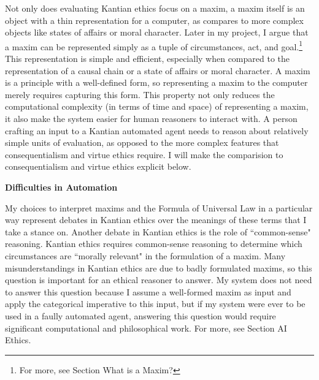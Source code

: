 \begin{isabellebody}
\begin{isamarkuptext}
Not only does evaluating Kantian ethics focus on a maxim, a maxim itself is an object
with a thin representation for a computer, as compares to more complex objects like states of 
affairs or moral character. Later in my project, I argue that a maxim can be represented simply as 
a tuple of circumstances, act, and goal.\footnote{For more, see Section What is a Maxim?} This representation
is simple and efficient, especially when compared to the representation of a causal chain or a state of 
affairs or moral character. A maxim is a principle with a well-defined form, so representing a maxim
to the computer merely requires capturing this form. This property not only reduces the computational complexity
(in terms of time and space) of representing a maxim, it also make the system easier for human reasoners
to interact with. A person crafting an input to a Kantian automated agent needs to reason about relatively
simple units of evaluation, as opposed to the more complex features that consequentialism and virtue
ethics require. I will make the comparision to consequentialism and virtue ethics explicit below.%
\end{isamarkuptext}\isamarkuptrue%
%
\begin{isamarkuptext}%
\textbf{Difficulties in Automation}%
\end{isamarkuptext}\isamarkuptrue%
%
\begin{isamarkuptext}%
My choices to interpret maxims and the Formula of Universal Law in a particular way represent debates
in Kantian ethics over the meanings of these terms that I take a stance on. Another debate in Kantian 
ethics is the role of ``common-sense" reasoning. Kantian ethics requires common-sense reasoning to 
determine which circumstances are ``morally relevant" in the formulation of a maxim. Many misunderstandings
in Kantian ethics are due to badly formulated maxims, so this question is important for an ethical 
reasoner to answer. My system does not need to answer this question because I assume a well-formed
maxim as input and apply the categorical imperative to this input, but if my system were ever to be used
in a faully automated agent, answering this question would require significant computational and philosophical
work. For more, see Section AI Ethics.


\end{isamarkuptext}
\end{isabellebody}
